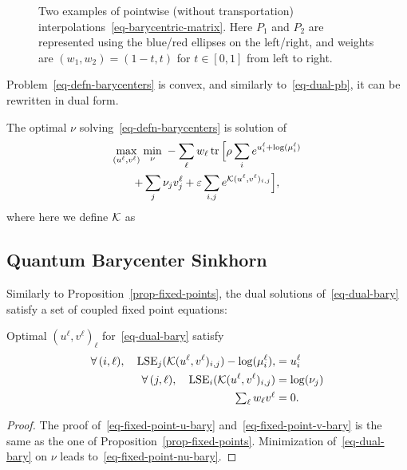 \begin{figure}\centering
{}
\caption{Two examples of pointwise (without transportation) interpolations~\eqref{eq-barycentric-matrix}. Here $P_1$ and $P_2$ are represented using the blue/red ellipses on the left/right, and weights are $(w_1,w_2)=(1-t,t)$ for $t \in [0,1]$ from left to right.} \label{fig:interp}
\end{figure}






Problem~\eqref{eq-defn-barycenters} is convex, and similarly to~\eqref{eq-dual-pb}, it can be rewritten in dual form.

\begin{prop}
The optimal $\nu$ solving~\eqref{eq-defn-barycenters} is solution of
\begin{multline}\label{eq-dual-bary}		
		\underset{(u^\ell,v^\ell)}{\max}\; \underset{\nu}{\min}\;
				- 
				\sum_\ell w_\ell 
					\operatorname{tr}\Big[
						\rho \sum_i e^{u_i^\ell+\log(\mu_i^\ell)} \\
					+    \sum_j \nu_j v_j^\ell
					+    \varepsilon \sum_{i,j}  e^{ \mathcal{K}(u^\ell,v^\ell)_{i,j} }
			 \Big], 
\end{multline}	
where here we define $\mathcal{K}$ as
\end{prop}





\subsection{Quantum Barycenter Sinkhorn}

Similarly to Proposition~\ref{prop-fixed-points}, the dual solutions of~\eqref{eq-dual-bary} satisfy a set of coupled fixed point equations:

\begin{prop}
Optimal $(u^\ell,v^\ell)_\ell$ for~\eqref{eq-dual-bary} satisfy 
\begin{align}
	\forall \, (i,\ell), \quad \operatorname{LSE}_j(\mathcal{K}(u^\ell,v^\ell)_{i,j})-\log(\mu_i^\ell), \label{eq-fixed-point-u-bary} 
		&= u_i^\ell \\
	\forall \, (j,\ell), \quad \operatorname{LSE}_i(\mathcal{K}(u^\ell,v^\ell)_{i,j}) \label{eq-fixed-point-v-bary}
		&= \log(\nu_j)\\ 
		 \textstyle \sum_\ell w_\ell v^\ell &= 0. \label{eq-fixed-point-nu-bary}
\end{align}
\end{prop}
\begin{proof}
The proof of~\eqref{eq-fixed-point-u-bary} and~\eqref{eq-fixed-point-v-bary} is the same as the one of Proposition~\ref{prop-fixed-points}.
Minimization of~\eqref{eq-dual-bary} on $\nu$ leads to~\eqref{eq-fixed-point-nu-bary}. 
\end{proof}

